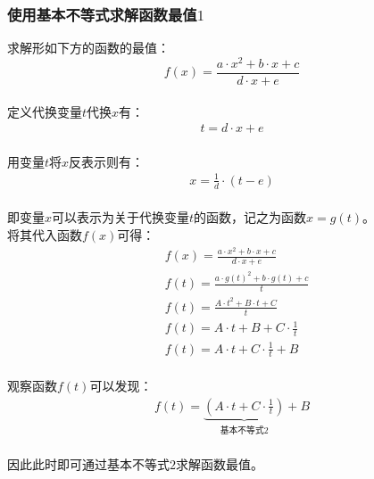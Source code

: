 \documentclass[UTF8]{ctexart}
\begin{document}
\newpage

\subsubsection{使用基本不等式求解函数最值$1$}
    求解形如下方的函数的最值：
    \setcounter{equation}{0}
    \begin{equation}
        f(x)=\frac{a\cdot x^2+b\cdot x+c}{d\cdot x+e}
    \end{equation}\\
    定义代换变量$t$代换$x$有：
    \begin{align}
        t=d\cdot x+e
    \end{align}\\
    用变量$t$将$x$反表示则有：
    \begin{align}
        x=\frac{1}{d}\cdot(t-e)
    \end{align}\\
    即变量$x$可以表示为关于代换变量$t$的函数，记之为函数$x=g(t)$。\\[16mm]
    将其代入函数$f(x)$可得：
    \begin{align}
        &f(x)=\frac{a\cdot x^2+b\cdot x+c}{d\cdot x+e}\\[3mm]
        &f(t)=\frac{a\cdot g(t)^2+b\cdot g(t)+c}{t}\\[3mm]
        &f(t)=\frac{A\cdot t^2+B\cdot t+C}{t}\\[3mm]
        &f(t)=A\cdot t+B+C\cdot\frac{1}{t}\\[3mm]
        &f(t)=A\cdot t+C\cdot\frac{1}{t}+B
    \end{align}\\
    观察函数$f(t)$可以发现：
    \begin{align}
        f(t)=\underbrace{\left(A\cdot t+C\cdot\frac{1}{t}\right)}_{\text{基本不等式2}}+B
    \end{align}\\
    因此此时即可通过基本不等式$2$求解函数最值。

\newpage
\end{document}
